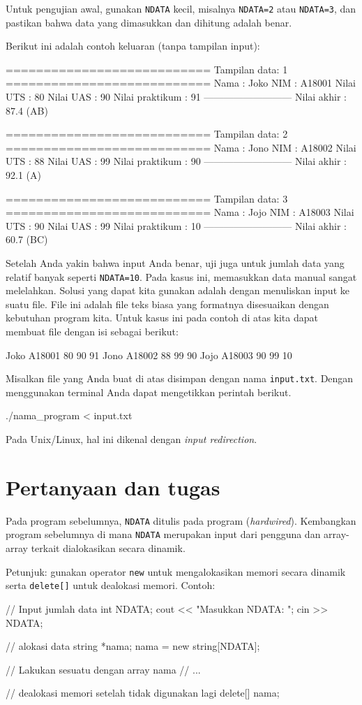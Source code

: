 \documentclass[a4paper,11pt]{extarticle}
\begin{document}
Untuk pengujian awal, gunakan \texttt{NDATA} kecil, misalnya \texttt{NDATA=2} atau
\texttt{NDATA=3}, dan pastikan bahwa data yang dimasukkan dan dihitung adalah benar.

Berikut ini adalah contoh keluaran (tanpa tampilan input):
\begin{textcode}
===========================
Tampilan data: 1
===========================
Nama            : Joko
NIM             : A18001
Nilai UTS       : 80
Nilai UAS       : 90
Nilai praktikum : 91
---------------------------
Nilai akhir     : 87.4 (AB)

===========================
Tampilan data: 2
===========================
Nama            : Jono
NIM             : A18002
Nilai UTS       : 88
Nilai UAS       : 99
Nilai praktikum : 90
---------------------------
Nilai akhir     : 92.1 (A)

===========================
Tampilan data: 3
===========================
Nama            : Jojo
NIM             : A18003
Nilai UTS       : 90
Nilai UAS       : 99
Nilai praktikum : 10
---------------------------
Nilai akhir     : 60.7 (BC)
\end{textcode}

Setelah Anda yakin bahwa input Anda benar, uji juga untuk jumlah data yang relatif
banyak seperti \texttt{NDATA=10}. Pada kasus ini, memasukkan data manual sangat melelahkan.
Solusi yang dapat kita gunakan adalah dengan menuliskan input ke suatu file.
File ini adalah file teks biasa yang formatnya disesuaikan dengan kebutuhan program
kita. Untuk kasus ini pada contoh di atas kita dapat membuat file dengan isi sebagai
berikut:
\begin{textcode}
Joko A18001 80 90 91
Jono A18002 88 99 90
Jojo A18003 90 99 10
\end{textcode}
Misalkan file yang Anda buat di atas disimpan dengan nama \texttt{input.txt}.
Dengan menggunakan terminal Anda dapat mengetikkan perintah berikut.
\begin{textcode}
./nama_program < input.txt
\end{textcode}
Pada Unix/Linux, hal ini dikenal dengan \textit{input redirection}.

\section{Pertanyaan dan tugas}

Pada program sebelumnya, \texttt{NDATA} ditulis pada program
(\textit{hardwired}). Kembangkan program sebelumnya di mana \texttt{NDATA}
merupakan input dari pengguna dan array-array terkait dialokasikan secara
dinamik.

Petunjuk: gunakan operator \texttt{new} untuk mengalokasikan memori secara dinamik
serta \texttt{delete[]} untuk dealokasi memori.
Contoh:
%
\begin{cppcode}
  // Input jumlah data
  int NDATA;
  cout << "Masukkan NDATA: ";
  cin >> NDATA;

  // alokasi data
  string *nama;
  nama = new string[NDATA];

  // Lakukan sesuatu dengan array nama
  // ...

  // dealokasi memori setelah tidak digunakan lagi
  delete[] nama;
\end{cppcode}
\end{document}
